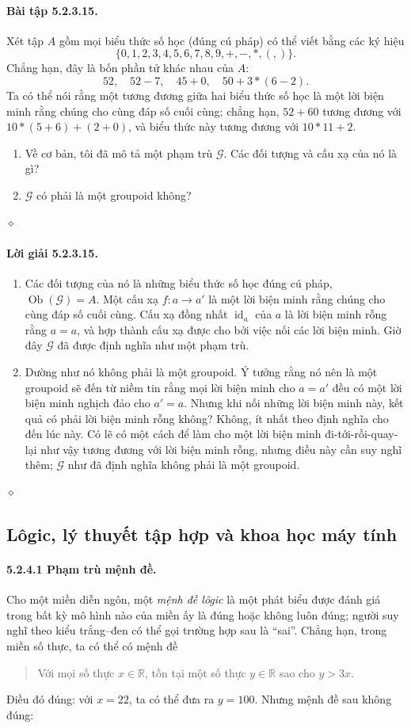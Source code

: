 \paragraph{Bài tập 5.2.3.15.} Xét tập $A$ gồm mọi biểu thức số học (đúng cú pháp) có thể viết bằng các ký hiệu
\[\{0,1,2,3,4,5,6,7,8,9,+,-,*,(,)\}.\]
Chẳng hạn, đây là bốn phần tử khác nhau của $A$:
\[52,\quad52-7,\quad45+0,\quad50+3*(6-2).\]
Ta có thể nói rằng một tương đương giữa hai biểu thức số học là một lời biện minh rằng chúng cho cùng đáp số cuối cùng; chẳng hạn, $52+60$ tương đương với $10*(5+6)+(2+0)$, và biểu thức này tương đương với $10*11+2$.
\begin{enumerate}[label=\alph*.]
\item Về cơ bản, tôi đã mô tả một phạm trù $\mathcal G$. Các đối tượng và cấu xạ của nó là gì?
\item $\mathcal G$ có phải là một groupoid không?
\end{enumerate}\hfill$\diamond$
\paragraph{Lời giải 5.2.3.15.}
\begin{enumerate}[label=\alph*.]
\item Các đối tượng của nó là những biểu thức số học đúng cú pháp, $\operatorname{Ob}(\mathcal G)=A$. Một cấu xạ $f:a\to a'$ là một lời biện minh rằng chúng cho cùng đáp số cuối cùng. Cấu xạ đồng nhất $\operatorname{id}_a$ của $a$ là lời biện minh rỗng rằng $a=a$, và hợp thành cấu xạ được cho bởi việc nối các lời biện minh. Giờ đây $\mathcal G$ đã được định nghĩa như một phạm trù.
\item Dường như nó không phải là một groupoid. Ý tưởng rằng nó nên là một groupoid sẽ đến từ niềm tin rằng mọi lời biện minh cho $a=a'$ đều có một lời biện minh nghịch đảo cho $a'=a$. Nhưng khi nối những lời biện minh này, kết quả có phải lời biện minh rỗng không? Không, ít nhất theo định nghĩa cho đến lúc này. Có lẽ có một cách để làm cho một lời biện minh đi-tới-rồi-quay-lại như vậy tương đương với lời biện minh rỗng, nhưng điều này cần suy nghĩ thêm; $\mathcal G$ như đã định nghĩa không phải là một groupoid.
\end{enumerate}\hfill$\diamond$
\subsection{Lôgic, lý thuyết tập hợp và khoa học máy tính}
\paragraph{5.2.4.1 Phạm trù mệnh đề.} Cho một miền diễn ngôn, một \emph{mệnh đề lôgic} là một phát biểu được đánh giá trong bất kỳ mô hình nào của miền ấy là đúng hoặc không luôn đúng; người suy nghĩ theo kiểu trắng--đen có thể gọi trường hợp sau là ``sai''. Chẳng hạn, trong miền số thực, ta có thể có mệnh đề
\begin{quote}Với mọi số thực $x\in\mathbb R$, tồn tại một số thực $y\in\mathbb R$ sao cho $y>3x$.\end{quote}
Điều đó đúng: với $x=22$, ta có thể đưa ra $y=100$. Nhưng mệnh đề sau không đúng:
